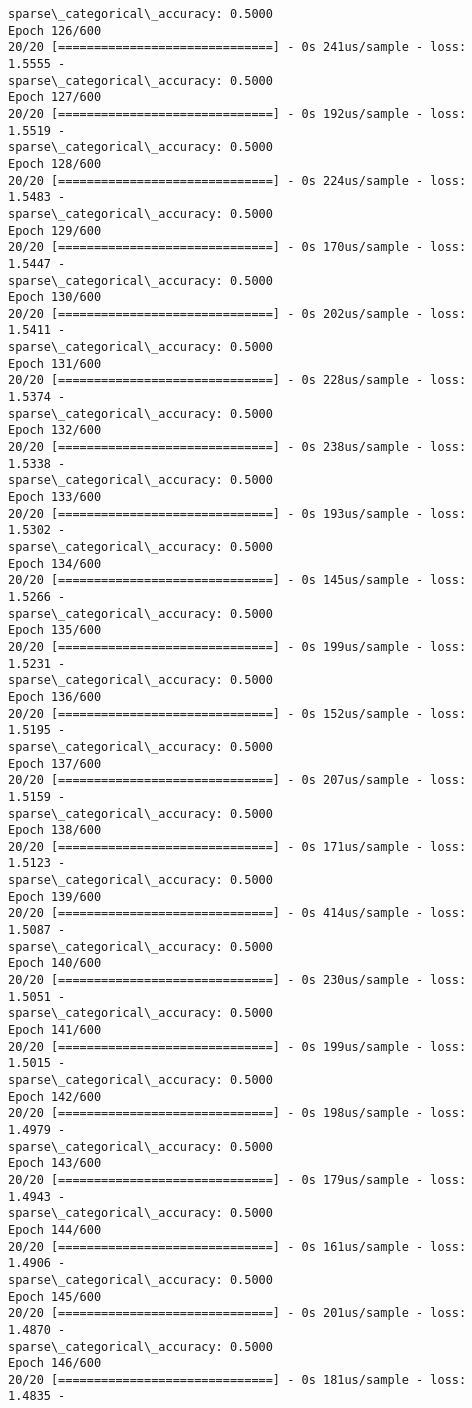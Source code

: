 \documentclass[11pt]{article}
\begin{document}
\begin{Verbatim}[commandchars=\\\{\}]
sparse\_categorical\_accuracy: 0.5000
Epoch 126/600
20/20 [==============================] - 0s 241us/sample - loss: 1.5555 -
sparse\_categorical\_accuracy: 0.5000
Epoch 127/600
20/20 [==============================] - 0s 192us/sample - loss: 1.5519 -
sparse\_categorical\_accuracy: 0.5000
Epoch 128/600
20/20 [==============================] - 0s 224us/sample - loss: 1.5483 -
sparse\_categorical\_accuracy: 0.5000
Epoch 129/600
20/20 [==============================] - 0s 170us/sample - loss: 1.5447 -
sparse\_categorical\_accuracy: 0.5000
Epoch 130/600
20/20 [==============================] - 0s 202us/sample - loss: 1.5411 -
sparse\_categorical\_accuracy: 0.5000
Epoch 131/600
20/20 [==============================] - 0s 228us/sample - loss: 1.5374 -
sparse\_categorical\_accuracy: 0.5000
Epoch 132/600
20/20 [==============================] - 0s 238us/sample - loss: 1.5338 -
sparse\_categorical\_accuracy: 0.5000
Epoch 133/600
20/20 [==============================] - 0s 193us/sample - loss: 1.5302 -
sparse\_categorical\_accuracy: 0.5000
Epoch 134/600
20/20 [==============================] - 0s 145us/sample - loss: 1.5266 -
sparse\_categorical\_accuracy: 0.5000
Epoch 135/600
20/20 [==============================] - 0s 199us/sample - loss: 1.5231 -
sparse\_categorical\_accuracy: 0.5000
Epoch 136/600
20/20 [==============================] - 0s 152us/sample - loss: 1.5195 -
sparse\_categorical\_accuracy: 0.5000
Epoch 137/600
20/20 [==============================] - 0s 207us/sample - loss: 1.5159 -
sparse\_categorical\_accuracy: 0.5000
Epoch 138/600
20/20 [==============================] - 0s 171us/sample - loss: 1.5123 -
sparse\_categorical\_accuracy: 0.5000
Epoch 139/600
20/20 [==============================] - 0s 414us/sample - loss: 1.5087 -
sparse\_categorical\_accuracy: 0.5000
Epoch 140/600
20/20 [==============================] - 0s 230us/sample - loss: 1.5051 -
sparse\_categorical\_accuracy: 0.5000
Epoch 141/600
20/20 [==============================] - 0s 199us/sample - loss: 1.5015 -
sparse\_categorical\_accuracy: 0.5000
Epoch 142/600
20/20 [==============================] - 0s 198us/sample - loss: 1.4979 -
sparse\_categorical\_accuracy: 0.5000
Epoch 143/600
20/20 [==============================] - 0s 179us/sample - loss: 1.4943 -
sparse\_categorical\_accuracy: 0.5000
Epoch 144/600
20/20 [==============================] - 0s 161us/sample - loss: 1.4906 -
sparse\_categorical\_accuracy: 0.5000
Epoch 145/600
20/20 [==============================] - 0s 201us/sample - loss: 1.4870 -
sparse\_categorical\_accuracy: 0.5000
Epoch 146/600
20/20 [==============================] - 0s 181us/sample - loss: 1.4835 -

\end{Verbatim}
\end{document}
